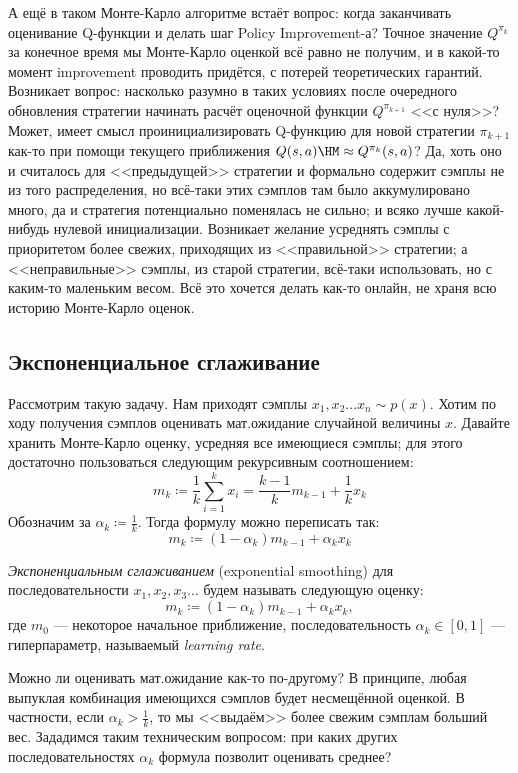 А ещё в таком Монте-Карло алгоритме встаёт вопрос: когда заканчивать оценивание Q-функции и делать шаг Policy Improvement-а? Точное значение $Q^{\pi_k}$ за конечное время мы Монте-Карло оценкой всё равно не получим, и в какой-то момент improvement проводить придётся, с потерей теоретических гарантий. Возникает вопрос: насколько разумно в таких условиях после очередного обновления стратегии начинать расчёт оценочной функции $Q^{\pi_{k+1}}$ <<с нуля>>? Может, имеет смысл проинициализировать Q-функцию для новой стратегии $\pi_{k+1}$ как-то при помощи текущего приближения $Q(s, a) \HM\approx Q^{\pi_k}(s, a)$? Да, хоть оно и считалось для <<предыдущей>> стратегии и формально содержит сэмплы не из того распределения, но всё-таки этих сэмплов там было аккумулировано много, да и стратегия потенциально поменялась не сильно; и всяко лучше какой-нибудь нулевой инициализации. Возникает желание усреднять сэмплы с приоритетом более свежих, приходящих из <<правильной>> стратегии; а <<неправильные>> сэмплы, из старой стратегии, всё-таки использовать, но с каким-то маленьким весом. Всё это хочется делать как-то онлайн, не храня всю историю Монте-Карло оценок.

\subsection{Экспоненциальное сглаживание}

Рассмотрим такую задачу. Нам приходят сэмплы $x_1, x_2 \dots x_n \sim p(x)$. Хотим по ходу получения сэмплов оценивать мат.ожидание случайной величины $x$. Давайте хранить Монте-Карло оценку, усредняя все имеющиеся сэмплы; для этого достаточно пользоваться следующим рекурсивным соотношением:
$$m_{k} \coloneqq \frac{1}{k} \sum_{i=1}^{k} x_i = \frac{k - 1}{k}m_{k-1} + \frac{1}{k}x_{k}$$
Обозначим за $\alpha_k \coloneqq \frac{1}{k}$. Тогда формулу можно переписать так:
$$m_{k} \coloneqq (1 - \alpha_k)m_{k-1} + \alpha_k x_{k}$$

\begin{definition}
\emph{Экспоненциальным сглаживанием} (exponential smoothing) для последовательности $x_1, x_2, x_3 \dots$ будем называть следующую оценку:
$$m_{k} \coloneqq (1 - \alpha_k) m_{k - 1} + \alpha_k x_k,$$
где $m_0$ --- некоторое начальное приближение, последовательность $\alpha_k \in [0, 1]$ --- гиперпараметр, называемый \emph{learning rate}. 
\end{definition}

Можно ли оценивать мат.ожидание как-то по-другому? В принципе, любая выпуклая комбинация имеющихся сэмплов будет несмещённой оценкой. В частности, если $\alpha_k > \frac{1}{k}$, то мы <<выдаём>> более свежим сэмплам больший вес. Зададимся таким техническим вопросом: при каких других последовательностях $\alpha_k$ формула позволит оценивать среднее?

